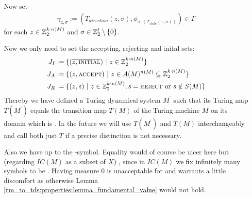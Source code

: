 Now set
\begin{align*}
	\gamma_{z,\sigma} := (T_{direction}(z,\sigma) , \phi_{\sigma,(T_{state}(z,\sigma))}) \in \Gamma
\end{align*}
for each $z \in \mathbb{Z}_2^{k \cdot n(M)}$ and $\sigma \in \mathbb{Z}_2^l \setminus \{0\}$.

Now we only need to set the accepting, rejecting and inital sets:
\begin{align*}
	J_I & := \{(\overline{z,\text{\scshape{initial}}}) ~\vert~ z \in \mathbb{Z}_2^{k \cdot n(M)} \} \\
	J_A & := \{(z,\text{\scshape{accept}}) ~\vert~ z \in A(M)^{n(M)} \subseteq \mathbb{Z}_2^{k \cdot n(M)} \} \\
	J_R & := \{(z,s) ~\vert~ z \in \mathbb{Z}_2^{k \cdot n(M)} , s = \text{\scshape{reject}} ~\text{or}~ s \notin S(M) \} \\
\end{align*}
Thereby we have defined a Turing dynamical system $M^\prime$ such that its Turing map $T(M^\prime)$ equals the transition map $T(M)$ of the Turing machine $M$ on its domain which is  .
In the future we will use $T(M^\prime)$ and $T(M)$ interchangeably and call both just $T$ if a precise distinction is not necessary.

Also we have  up to the \DELIM-symbol.
Equality would of course be nicer here but (regarding $IC(M)$ as a subset of $X$) , since in $IC(M)$ we fix infinitely many symbols to be \EMP.
Having measure $0$ is unacceptable for  and warrants a little discomfort as otherwise Lemma \ref{tm_to_tds:properties:lemma_fundamental_value} would not hold. 

